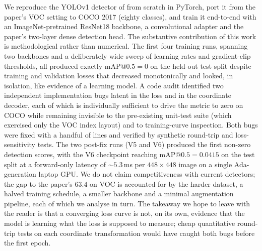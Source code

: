 We reproduce the YOLOv1 detector of \citet{redmon2016you} from scratch in
PyTorch, port it from the paper's VOC setting to COCO 2017 (eighty classes),
and train it end-to-end with an ImageNet-pretrained ResNet18 backbone, a
convolutional adapter and the paper's two-layer dense detection head.
The substantive contribution of this work is methodological rather than
numerical. The first four training runs, spanning two backbones and a
deliberately wide sweep of learning rates and gradient-clip thresholds, all
produced exactly $\mathrm{mAP}@0.5 = 0$ on the held-out test split despite
training and validation losses that decreased monotonically and looked, in
isolation, like evidence of a learning model. A code audit identified two
independent implementation bugs latent in the loss and in the coordinate
decoder, each of which is individually sufficient to drive the metric to
zero on COCO while remaining invisible to the pre-existing unit-test suite
(which exercised only the VOC index layout) and to training-curve
inspection. Both bugs were fixed with a handful of lines and verified by
synthetic round-trip and loss-sensitivity tests. The two post-fix runs (V5
and V6) produced the first non-zero detection scores, with the V6 checkpoint
reaching $\mathrm{mAP}@0.5 = 0.0415$ on the test split at a forward-only
latency of $\sim\!5.3$\,ms per $448\!\times\!448$ image on a single
Ada-generation laptop GPU. We do not claim competitiveness with current
detectors; the gap to the paper's $63.4$ on VOC is accounted for by the
harder dataset, a halved training schedule, a smaller backbone and a minimal
augmentation pipeline, each of which we analyse in turn. The takeaway we
hope to leave with the reader is that a converging loss curve is not, on
its own, evidence that the model is learning what the loss is supposed to
measure; cheap quantitative round-trip tests on each coordinate
transformation would have caught both bugs before the first epoch.
